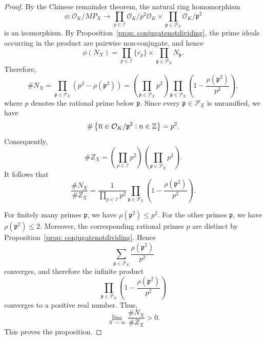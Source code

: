 \documentclass[10pt,a4paper]{amsart}
\begin{document}
\begin{proof}
    By the Chinese remainder theorem, the natural ring homomorphism
    \[
        \phi: \mathcal{O}_K/MP_X \longrightarrow \prod_{p\in\mathcal{I}} \mathcal{O}_K/p^2\mathcal{O}_K \times \prod_{\mathfrak{p}\in\mathcal{P}_X} \mathcal{O}_K/\mathfrak{p}^2
    \]
    is an isomorphism. By Proposition~\ref{prop: conjugatenotdividing}, the prime ideals occurring in the product are pairwise non-conjugate, and hence
    \[
        \phi(N_X) = \prod_{p\in\mathcal{I}}\{\overline{r_p}\} \times \prod_{\mathfrak{p}\in\mathcal{P}_X} N_{\mathfrak{p}}.
    \]
    Therefore,
    \[
        \#N_X = \prod_{\mathfrak{p}\in\mathcal{P}_X} \left(p^2-\rho(\mathfrak{p}^2)\right) = \left(\prod_{\mathfrak{p}\in\mathcal{P}_X}p^2\right) \prod_{\mathfrak{p}\in\mathcal{P}_X} \left(1-\frac{\rho(\mathfrak{p}^2)}{p^2}\right),
    \]
    where $p$ denotes the rational prime below $\mathfrak{p}$. Since every $\mathfrak{p}\in\mathcal{P}_X$ is unramified, we have
    \[ 
        \#\left\{\overline{n}\in\mathcal{O}_K/\mathfrak{p}^2 \vcentcolon n\in\mathbb{Z}\right\} = p^2.
    \]
    Consequently,
    \[  
        \#Z_X =\left(\prod_{p\in\mathcal{I}}p^2\right)\left(\prod_{\mathfrak{p}\in\mathcal{P}_X}p^2\right).
    \]
    It follows that
    \[
        \frac{\#N_X}{\#Z_X} = \frac{1}{\displaystyle\prod_{p\in\mathcal{I}}p^2} \prod_{\mathfrak{p}\in\mathcal{P}_X} \left(1-\frac{\rho(\mathfrak{p}^2)}{p^2}\right).
    \]
    
    For finitely many primes $\mathfrak{p}$, we have $\rho(\mathfrak{p}^2)\leq p^2$. For the other primes $\mathfrak{p}$, we have $\rho(\mathfrak{p}^2)\leq2$. Moreover, the corresponding rational primes $p$ are distinct by Proposition~\ref{prop: conjugatenotdividing}. Hence
    \[
        \sum_{\mathfrak{p} \in \mathcal{P}_X} \frac{\rho(\mathfrak{p}^2)}{p^2}
    \]
    converges, and therefore the infinite product
    \[
        \prod_{\mathfrak{p} \in \mathcal{P}_X}\left(1-\frac{\rho(\mathfrak{p}^2)}{p^2}\right)
    \]
    converges to a positive real number. Thus,
    \[
        \lim_{X\to\infty}\frac{\#N_X}{\#Z_X}>0.
    \]
    This proves the proposition.
\end{proof}
\end{document}
